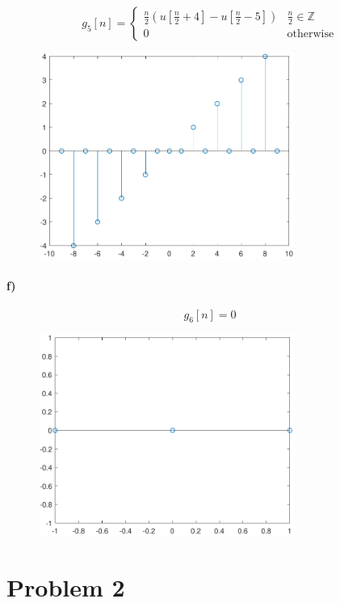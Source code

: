 \documentclass[12pt]{article}
\begin{document}
\[g_5[n]=\begin{cases}
    \frac{n}{2}\left(u\left[\frac{n}{2}+4\right]-u\left[\frac{n}{2}-5\right]\right) & \frac{n}{2}\in\mathbb{Z}\\
    0 & \text{otherwise}
\end{cases}\]
\begin{figure}[H]
    \begin{center}
        \includegraphics[width=3.3in]{problem1e.pdf}
    \end{center}
\end{figure}

\paragraph{f)}

\[g_6[n]=0\]
\begin{figure}[H]
    \begin{center}
        \includegraphics[width=3.3in]{problem1f.pdf}
    \end{center}
\end{figure}

\section*{Problem 2}
\end{document}
